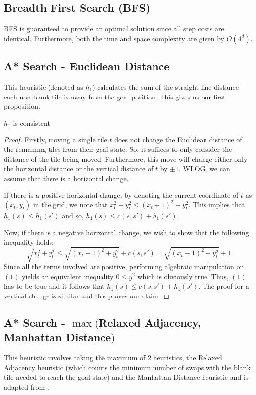 \documentclass[runningheads]{llncs}
\begin{document}
\subsection{Breadth First Search (BFS)}
BFS is guaranteed to provide an optimal solution since all step costs are identical. Furthermore, both the time and space complexity are given by $O(4^d)$.

\subsection{A* Search - Euclidean Distance}
This heuristic (denoted as $h_1$) calculates the sum of the straight line distance each non-blank tile is away from the goal position. This gives us our first proposition.

\begin{theorem} 
$h_1$ is consistent.
\end{theorem}

\begin{proof}
Firstly, moving a single tile $t$ does not change the Euclidean distance of the remaining tiles from their goal state. So, it suffices to only consider the distance of the tile being moved. Furthermore, this move will change either only the horizontal distance or the vertical distance of $t$ by $\pm 1$. WLOG, we can assume that there is a horizontal change. 

If there is a positive horizontal change, by denoting the current coordinate of $t$ as $(x_t, y_t)$ in the grid, we note that $x_{t}^{2} + y_{t}^{2} \leq \left( x_{t} + 1 \right)^{2} + y_{t}^2$. This implies that $h_1(s) \leq h_1(s')$ and so, $h_1(s) \leq c(s, s') + h_1(s')$.

Now, if there is a negative horizontal change, we wish to show that the following inequality holds:
\begin{equation}
    \sqrt{x_{t}^{2} + y_{t}^{2}} \leq \sqrt{(x_{t} - 1)^{2} + y_{t}^{2}} + c(s, s') = \sqrt{(x_{t} - 1)^{2} + y_{t}^{2}} + 1
\end{equation}
Since all the terms involved are positive, performing algebraic manipulation on $(1)$ yields an equivalent inequality $0 \leq y^{2}$ which is obviously true. Thus, $(1)$ has to be true and it follows that $h_{1}(s) \leq c(s, s') + h_1(s')$. The proof for a vertical change is similar and this proves our claim.
\end{proof}

\subsection{A* Search - $\max($Relaxed Adjacency, Manhattan Distance$)$}
This heuristic involves taking the maximum of 2 heuristics, the Relaxed Adjacency heuristic (which counts the minimum number of swaps with the blank tile needed to reach the goal state) and the Manhattan Distance heuristic and is adapted from \cite{ref_2}. 
\end{document}
